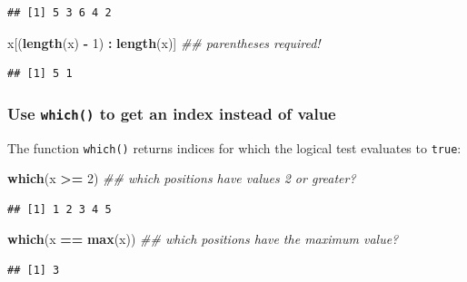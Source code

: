\documentclass[]{book}
\newenvironment{Shaded}{\begin{snugshade}}{\end{snugshade}}
\newcommand{\CommentTok}[1]{\textcolor[rgb]{0.56,0.35,0.01}{\textit{#1}}}
\newcommand{\DecValTok}[1]{\textcolor[rgb]{0.00,0.00,0.81}{#1}}
\newcommand{\KeywordTok}[1]{\textcolor[rgb]{0.13,0.29,0.53}{\textbf{#1}}}
\newcommand{\NormalTok}[1]{#1}
\newcommand{\OperatorTok}[1]{\textcolor[rgb]{0.81,0.36,0.00}{\textbf{#1}}}
\newcommand{\StringTok}[1]{\textcolor[rgb]{0.31,0.60,0.02}{#1}}
\begin{document}
\begin{verbatim}
## [1] 5 3 6 4 2
\end{verbatim}

\begin{Shaded}
\begin{Highlighting}[]
\NormalTok{x[(}\KeywordTok{length}\NormalTok{(x) }\OperatorTok{-}\StringTok{ }\DecValTok{1}\NormalTok{) }\OperatorTok{:}\StringTok{ }\KeywordTok{length}\NormalTok{(x)] }\CommentTok{## parentheses required!}
\end{Highlighting}
\end{Shaded}

\begin{verbatim}
## [1] 5 1
\end{verbatim}

\hypertarget{use-which-to-get-an-index-instead-of-value}{%
\subsubsection*{\texorpdfstring{Use \texttt{which()} to get an index instead of value}{Use which() to get an index instead of value}}\label{use-which-to-get-an-index-instead-of-value}}

The function \texttt{which()} returns indices for which the logical test evaluates to \texttt{true}:

\begin{Shaded}
\begin{Highlighting}[]
\KeywordTok{which}\NormalTok{(x }\OperatorTok{>=}\StringTok{ }\DecValTok{2}\NormalTok{) }\CommentTok{## which positions have values 2 or greater?}
\end{Highlighting}
\end{Shaded}

\begin{verbatim}
## [1] 1 2 3 4 5
\end{verbatim}

\begin{Shaded}
\begin{Highlighting}[]
\KeywordTok{which}\NormalTok{(x }\OperatorTok{==}\StringTok{ }\KeywordTok{max}\NormalTok{(x)) }\CommentTok{## which positions have the maximum value?}
\end{Highlighting}
\end{Shaded}

\begin{verbatim}
## [1] 3
\end{verbatim}
\end{document}
